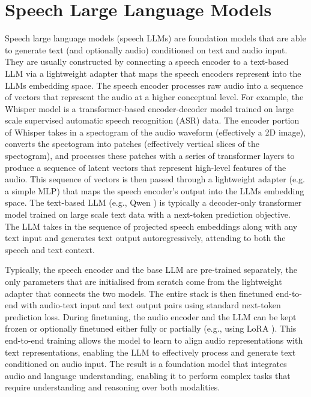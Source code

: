 \documentclass{report}
\begin{document}
\section{Speech Large Language Models}
\label{sec:speech_large_language_models}
Speech large language models (speech LLMs) are foundation models that are able to generate text (and optionally audio) conditioned on text and audio input. They are usually constructed by connecting a speech encoder to a text-based LLM via a lightweight adapter that maps the speech encoders represent into the LLMs embedding space. The speech encoder processes raw audio into a sequence of vectors that represent the audio at a higher conceptual level. For example, the Whisper model \citep{radford2022robustspeechrecognitionlargescale} is a transformer-based encoder-decoder model trained on large scale supervised automatic speech recognition (ASR) data. The encoder portion of Whisper takes in a spectogram of the audio waveform (effectively a 2D image), converts the spectogram into patches (effectively vertical slices of the spectogram), and processes these patches with a series of transformer layers to produce a sequence of latent vectors that represent high-level features of the audio. This sequence of vectors is then passed through a lightweight adapter (e.g. a simple MLP) that maps the speech encoder’s output into the LLMs embedding space. The text-based LLM (e.g., Qwen \citep{chu2023qwenaudioadvancinguniversalaudio}) is typically a decoder-only transformer model trained on large scale text data with a next-token prediction objective. The LLM takes in the sequence of projected speech embeddings along with any text input and generates text output autoregressively, attending to both the speech and text context.

Typically, the speech encoder and the base LLM are pre-trained separately, the only parameters that are initialised from scratch come from the lightweight adapter that connects the two models. The entire stack is then finetuned end-to-end with audio-text input and text output pairs using standard next-token prediction loss. During finetuning, the audio encoder and the LLM can be kept frozen or optionally finetuned either fully or partially (e.g., using LoRA \citep{hu2021loralowrankadaptationlarge}). This end-to-end training allows the model to learn to align audio representations with text representations, enabling the LLM to effectively process and generate text conditioned on audio input. The result is a foundation model that integrates audio and language understanding, enabling it to perform complex tasks that require understanding and reasoning over both modalities.
\end{document}
